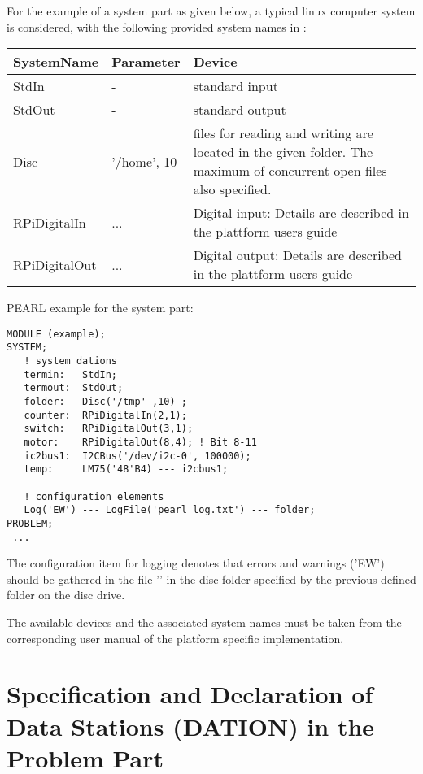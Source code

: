 For the example of a system part as given below, a typical linux computer
system is considered, with the following provided system names in \OpenPEARL{}:

\begin{tabular}{ll@{\x}p{6cm}}
SystemName & Parameter & Device \\ \hline
StdIn  &  - & standard input \\
StdOut  &  - & standard output \\
Disc       & '/home', 10 & files for reading and writing are located in the given folder. The maximum of concurrent open files also specified. \\
RPiDigitalIn & ... & Digital input: Details are described in 
		the plattform users guide \\
RPiDigitalOut & ... & Digital output: Details are described in 
		the plattform users guide \\
\end{tabular}

PEARL example for the system part:

\begin{lstlisting}
MODULE (example); 
SYSTEM; 
   ! system dations 
   termin:   StdIn; 
   termout:  StdOut;
   folder:   Disc('/tmp' ,10) ;  
   counter:  RPiDigitalIn(2,1); 
   switch:   RPiDigitalOut(3,1); 
   motor:    RPiDigitalOut(8,4); ! Bit 8-11
   ic2bus1:  I2CBus('/dev/i2c-0', 100000);
   temp:     LM75('48'B4) --- i2cbus1;

   ! configuration elements 
   Log('EW') --- LogFile('pearl_log.txt') --- folder; 
PROBLEM;
 ...
\end{lstlisting}


The configuration item for logging denotes that errors and warnings ('EW')
should be gathered in the file '' in the disc folder specified
by the previous defined folder on the disc drive.

The available devices and the associated system names must be taken from
the corresponding user manual of the \OpenPEARL{} platform 
specific implementation.

\section{Specification and Declaration of Data Stations (DATION) in 
the Problem Part}   %
\label{sec_dation_problem_part}

